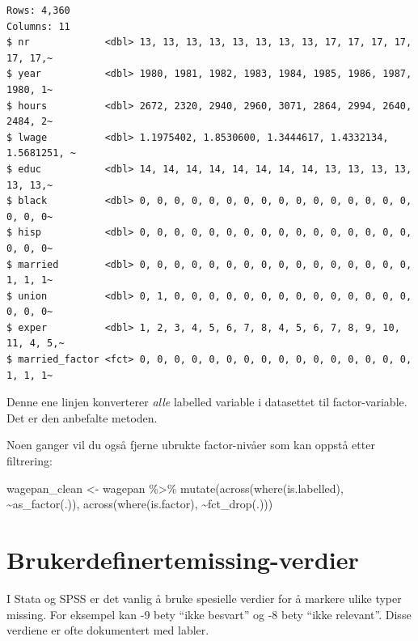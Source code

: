 \documentclass[
  norsk,
  letterpaper,
  DIV=11,
  numbers=noendperiod]{scrreprt}
\newenvironment{Shaded}{\begin{snugshade}}{\end{snugshade}}
\newcommand{\FunctionTok}[1]{\textcolor[rgb]{0.28,0.35,0.67}{#1}}
\newcommand{\NormalTok}[1]{\textcolor[rgb]{0.00,0.23,0.31}{#1}}
\newcommand{\OtherTok}[1]{\textcolor[rgb]{0.00,0.23,0.31}{#1}}
\newcommand{\SpecialCharTok}[1]{\textcolor[rgb]{0.37,0.37,0.37}{#1}}
\theoremstyle{definition}
\theoremstyle{remark}
\begin{document}
\begin{verbatim}
Rows: 4,360
Columns: 11
$ nr             <dbl> 13, 13, 13, 13, 13, 13, 13, 13, 17, 17, 17, 17, 17, 17,~
$ year           <dbl> 1980, 1981, 1982, 1983, 1984, 1985, 1986, 1987, 1980, 1~
$ hours          <dbl> 2672, 2320, 2940, 2960, 3071, 2864, 2994, 2640, 2484, 2~
$ lwage          <dbl> 1.1975402, 1.8530600, 1.3444617, 1.4332134, 1.5681251, ~
$ educ           <dbl> 14, 14, 14, 14, 14, 14, 14, 14, 13, 13, 13, 13, 13, 13,~
$ black          <dbl> 0, 0, 0, 0, 0, 0, 0, 0, 0, 0, 0, 0, 0, 0, 0, 0, 0, 0, 0~
$ hisp           <dbl> 0, 0, 0, 0, 0, 0, 0, 0, 0, 0, 0, 0, 0, 0, 0, 0, 0, 0, 0~
$ married        <dbl> 0, 0, 0, 0, 0, 0, 0, 0, 0, 0, 0, 0, 0, 0, 0, 0, 1, 1, 1~
$ union          <dbl> 0, 1, 0, 0, 0, 0, 0, 0, 0, 0, 0, 0, 0, 0, 0, 0, 0, 0, 0~
$ exper          <dbl> 1, 2, 3, 4, 5, 6, 7, 8, 4, 5, 6, 7, 8, 9, 10, 11, 4, 5,~
$ married_factor <fct> 0, 0, 0, 0, 0, 0, 0, 0, 0, 0, 0, 0, 0, 0, 0, 0, 1, 1, 1~
\end{verbatim}

Denne ene linjen konverterer \emph{alle} labelled variable i datasettet
til factor-variable. Det er den anbefalte metoden.

Noen ganger vil du også fjerne ubrukte factor-nivåer som kan oppstå
etter filtrering:

\begin{Shaded}
\begin{Highlighting}[]
\NormalTok{wagepan\_clean }\OtherTok{\textless{}{-}}\NormalTok{ wagepan }\SpecialCharTok{\%\textgreater{}\%}
  \FunctionTok{mutate}\NormalTok{(}\FunctionTok{across}\NormalTok{(}\FunctionTok{where}\NormalTok{(is.labelled), }\SpecialCharTok{\textasciitilde{}}\FunctionTok{as\_factor}\NormalTok{(.)),}
         \FunctionTok{across}\NormalTok{(}\FunctionTok{where}\NormalTok{(is.factor), }\SpecialCharTok{\textasciitilde{}}\FunctionTok{fct\_drop}\NormalTok{(.)))}
\end{Highlighting}
\end{Shaded}

\section{Brukerdefinertemissing-verdier}\label{brukerdefinertemissing-verdier}

I Stata og SPSS er det vanlig å bruke spesielle verdier for å markere
ulike typer missing. For eksempel kan -9 bety ``ikke besvart'' og -8
bety ``ikke relevant''. Disse verdiene er ofte dokumentert med labler.
\end{document}
